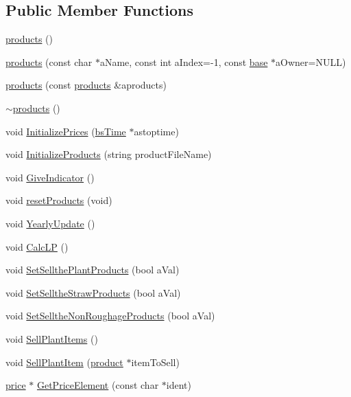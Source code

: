\subsection*{Public Member Functions}
\begin{DoxyCompactItemize}
\item 
\hyperlink{classproducts_a7d8600c3aa1b8a5e03e3e75b44fe9969}{products} ()
\item 
\hyperlink{classproducts_a2f166f5fe4998ec698692c5debaecc5a}{products} (const char $\ast$aName, const int aIndex=-\/1, const \hyperlink{classbase}{base} $\ast$aOwner=NULL)
\item 
\hyperlink{classproducts_a645a76ba77506cb12a782ea5acefffa3}{products} (const \hyperlink{classproducts}{products} \&aproducts)
\item 
\hyperlink{classproducts_a5591d80f0a425a5da2bbd6e7ffa663f7}{$\sim$products} ()
\item 
void \hyperlink{classproducts_a5787b3bc5b31d226344648957a220079}{InitializePrices} (\hyperlink{classbs_time}{bsTime} $\ast$astoptime)
\item 
void \hyperlink{classproducts_a4a370f5607ce63962bff3171ce7e8a62}{InitializeProducts} (string productFileName)
\item 
void \hyperlink{classproducts_af5ff2786f9e1eb1131408cd8d7bd6029}{GiveIndicator} ()
\item 
void \hyperlink{classproducts_aa1d3d08b456680000b791f91f8238127}{resetProducts} (void)
\item 
void \hyperlink{classproducts_a052853a033f88f5928b69a46ef279915}{YearlyUpdate} ()
\item 
void \hyperlink{classproducts_a209fca31666e9abd3077b88f62e99ca9}{CalcLP} ()
\item 
void \hyperlink{classproducts_af814d0f34312e7f13be312349d2795aa}{SetSellthePlantProducts} (bool aVal)
\item 
void \hyperlink{classproducts_a4d9d3e19c3ab53930d506d69d10cf7bd}{SetSelltheStrawProducts} (bool aVal)
\item 
void \hyperlink{classproducts_a6ff256b2b2b02cccbeffdcf3e10daf6b}{SetSelltheNonRoughageProducts} (bool aVal)
\item 
void \hyperlink{classproducts_aafdc02da42b92ae8cf0bb1a24664500d}{SellPlantItems} ()
\item 
void \hyperlink{classproducts_a582a5c70832b8f9c53fb1103944c4bca}{SellPlantItem} (\hyperlink{classproduct}{product} $\ast$itemToSell)
\item 
\hyperlink{classprice}{price} $\ast$ \hyperlink{classproducts_a33388ac3221fd6116d2dae25543685c1}{GetPriceElement} (const char $\ast$ident)

\end{DoxyCompactItemize}
